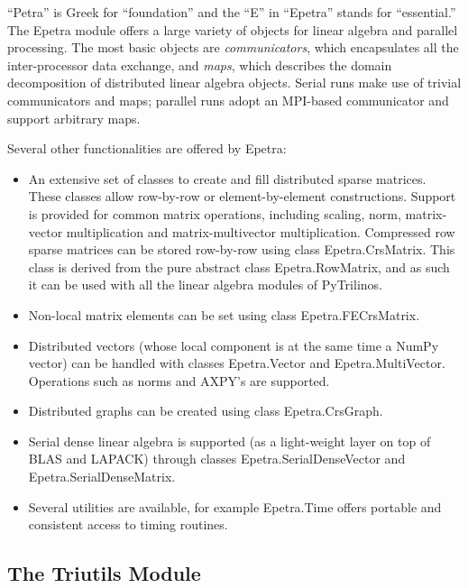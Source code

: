 \documentclass[acmtocl]{acmtrans2m}
\newcommand{\PyTrilinos}{{PyTrilinos}}
\begin{document}
``Petra'' is Greek for ``foundation'' and the ``E'' in ``Epetra''
stands for ``essential.''  The Epetra module offers a large variety of
objects for linear algebra and parallel processing.  The most basic
objects are {\sl communicators}, which encapsulates all the
inter-processor data exchange, and {\sl maps}, which describes the
domain decomposition of distributed linear algebra objects.  Serial
runs make use of trivial communicators and maps; parallel runs adopt
an MPI-based communicator and support arbitrary maps.

Several other functionalities are offered by Epetra:
\begin{itemize}

\item An extensive set of classes to create and fill distributed
  sparse matrices.  These classes allow row-by-row or
  element-by-element constructions.  Support is provided for common
  matrix operations, including scaling, norm, matrix-vector
  multiplication and matrix-multivector multiplication.  Compressed
  row sparse matrices can be stored row-by-row using class
  Epetra.CrsMatrix.  This class is derived from the pure abstract
  class Epetra.RowMatrix, and as such it can be used with all the
  linear algebra modules of \PyTrilinos.

\item Non-local matrix elements can be set using class
  Epetra.FECrsMatrix.

\item Distributed vectors (whose local component is at the same time a
  NumPy vector) can be handled with classes Epetra.Vector and
  Epetra.MultiVector.  Operations such as norms and AXPY's are
  supported.

\item Distributed graphs can be created using class Epetra.CrsGraph.

\item Serial dense linear algebra is supported (as a light-weight
  layer on top of BLAS and LAPACK) through classes
  Epetra.SerialDenseVector and Epetra.SerialDenseMatrix.

\item Several utilities are available, for example Epetra.Time offers
  portable and consistent access to timing routines.

\end{itemize}

\subsection{The Triutils Module}
\label{subsec:triutils}
\end{document}
